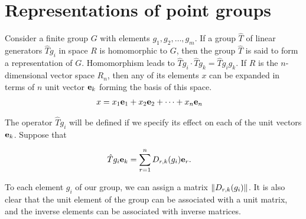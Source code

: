 \section{Representations of point groups} %
\label{sec:Representations of point groups}

Consider a finite group $G$ with elements $g_1,g_2,\dots,g_m$. If a group $\hat{T}$
of linear generators $\hat{T}g_i$ in space $R$ is homomorphic to $G$, then the
group $\hat{T}$ is said to form a representation of $G$.
Homomorphism leads to $\hat{T}g_i\cdot\hat{T}g_k=\hat{T}g_ig_k$. If $R$ is the
$n$-dimensional vector space $R_n$, then any of its elements $x$ can be expanded
in terms of $n$ unit vector $\vb{e}_k$ forming the basis of this space.
\begin{align}
    x&=x_1\vb{e}_1+x_2\vb{e}_2+\dots+x_n\vb{e}_n
\end{align}

The operator $\hat{T}g_i$ will be defined if we specify its effect on each
of the unit vectors $\vb{e}_k$. Suppose that

\begin{align}
    \hat{T}g_i\vb{e}_k&=\sum_{r=1}^nD_{r,k}(g_i)\vb{e}_r.
\end{align}

To each element $g_i$ of our group, we can assign a matrix $\norm{D_{r,k}(g_i)}$.
It is also clear that the unit element of the group can be associated with a unit
matrix, and the inverse elements can be associated with inverse matrices.

